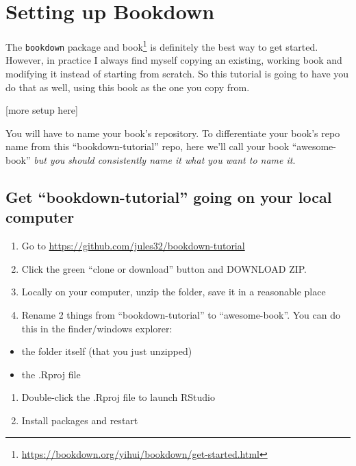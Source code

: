 \documentclass[
]{book}
\providecommand{\tightlist}{%
  \setlength{\itemsep}{0pt}\setlength{\parskip}{0pt}}
\renewcommand{\href}[2]{#2\footnote{\url{#1}}}
\begin{document}
\hypertarget{setup}{%
\chapter{Setting up Bookdown}\label{setup}}

The \texttt{bookdown} package and \href{https://bookdown.org/yihui/bookdown/get-started.html}{book} is definitely the best way to get started. However, in practice I always find myself copying an existing, working book and modifying it instead of starting from scratch. So this tutorial is going to have you do that as well, using this book as the one you copy from.

{[}more setup here{]}

You will have to name your book's repository. To differentiate your book's repo name from this ``bookdown-tutorial'' repo, here we'll call your book ``awesome-book'' \emph{but you should consistently name it what you want to name it}.

\hypertarget{get-bookdown-tutorial-going-on-your-local-computer}{%
\section{Get ``bookdown-tutorial'' going on your local computer}\label{get-bookdown-tutorial-going-on-your-local-computer}}

\begin{enumerate}
\def\labelenumi{\arabic{enumi}.}
\tightlist
\item
  Go to \url{https://github.com/jules32/bookdown-tutorial}
\item
  Click the green ``clone or download'' button and DOWNLOAD ZIP.
\item
  Locally on your computer, unzip the folder, save it in a reasonable place
\item
  Rename 2 things from ``bookdown-tutorial'' to ``awesome-book''. You can do this in the finder/windows explorer:
\end{enumerate}

\begin{itemize}
\tightlist
\item
  the folder itself (that you just unzipped)
\item
  the .Rproj file
\end{itemize}

\begin{enumerate}
\def\labelenumi{\arabic{enumi}.}
\tightlist
\item
  Double-click the .Rproj file to launch RStudio
\item
  Install packages and restart
\end{enumerate}
\end{document}
